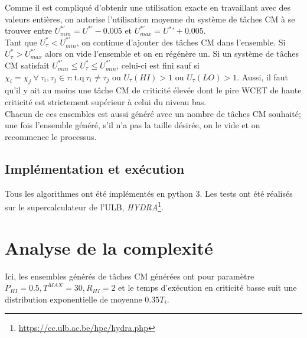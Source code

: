 \documentclass[12pt,a4paper,oneside]{book}
\theoremstyle{break}
\theoremstyle{breakplain}
\begin{document}
Comme il est compliqué d'obtenir une utilisation exacte en travaillant avec des valeurs entières, on autorise l'utilisation moyenne du système de tâches CM à se trouver entre $U_{min}^{*'} = U^{*'}-0.005$ et $U_{max}^{*'} = U{^*}'+0.005$.\\

Tant que $U^*_\tau < U_{min}^{*'}$, on continue d'ajouter des tâches CM dans l'ensemble. Si $U^*_\tau > U_{max}^{*'}$ alors on vide l'ensemble et on en régénère un. Si un système de tâches CM satisfait $U_{min}^{*'} \leq U_\tau^* \leq  U_{min}^{*'}$, celui-ci est fini sauf si $\chi_i = \chi_j\ \forall\ \tau_i,\tau_j \in \tau : \mbox{t.q}\ \tau_i \neq \tau_j$ ou $U_\tau(HI) > 1$ ou $U_\tau(LO) > 1$. Aussi, il faut qu'il y ait au moins une tâche CM de criticité élevée dont le pire WCET de haute criticité est strictement supérieur à celui du niveau bas.\\

Chacun de ces ensembles est aussi généré avec un nombre de tâches CM souhaité; une fois l'ensemble généré, s'il n'a pas la taille désirée, on le vide et on recommence le processus.

\subsection{Implémentation et exécution}
Tous les algorithmes ont été implémentés en python 3. Les tests ont été réalisés sur le supercalculateur de l'ULB, \textit{HYDRA}\footnote{\url{https://cc.ulb.ac.be/hpc/hydra.php}}.

\section{Analyse de la complexité}
Ici, les ensembles générés de tâches CM générées ont pour paramètre $P_{HI} = 0.5, T^{MAX} = 30, R_{HI} = 2$ et le temps d'exécution en criticité basse suit une distribution exponentielle de moyenne $0.35 T_i$.\\
\end{document}
